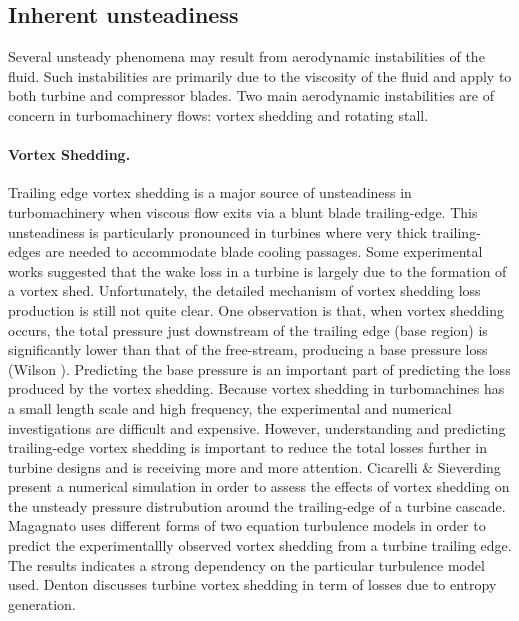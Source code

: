 \subsection{Inherent unsteadiness}
%
 Several unsteady phenomena may result from aerodynamic instabilities
 of the fluid. Such instabilities are primarily due to the viscosity
 of the fluid and apply to both turbine and compressor blades.
 Two main aerodynamic instabilities are of concern
 in turbomachinery flows: vortex shedding and rotating stall.
%
\paragraph{Vortex Shedding.}
%
 Trailing edge vortex shedding is a major source of unsteadiness in turbomachinery
 when viscous flow exits via a blunt blade trailing-edge. This unsteadiness
 is particularly pronounced in turbines where very thick trailing-edges are
 needed to accommodate blade cooling passages.
 Some experimental works suggested that the wake loss in a turbine is
 largely due to the formation of a vortex shed.
 Unfortunately, the detailed mechanism of vortex shedding loss production
 is still not quite clear.
 One observation is that, when vortex shedding occurs,
 the total pressure just downstream of the trailing
 edge (base region) is significantly lower than that of the free-stream,
 producing a base pressure loss (Wilson ).
 Predicting the base pressure is an important part of predicting the loss
 produced by the vortex shedding. Because vortex shedding in turbomachines
 has a small length scale and high frequency, the experimental and numerical
 investigations are difficult and expensive. However, understanding
 and predicting trailing-edge vortex shedding
 is important to reduce the total losses further in turbine designs
 and is receiving more and more attention.
 Cicarelli \& Sieverding \citeyear{Sieverding:2} present a numerical simulation
 in order to assess the effects of vortex shedding on the unsteady pressure
 distrubution around the trailing-edge of a turbine cascade.
 Magagnato \citeyear{Magagnato:1} uses different forms of two equation
 turbulence models in order to predict the experimentallly observed vortex
 shedding from a turbine trailing edge. The results indicates a strong
 dependency on the particular turbulence model used.
 Denton \citeyear{Denton:2} discusses turbine vortex shedding in term
 of losses due to entropy generation.
%

